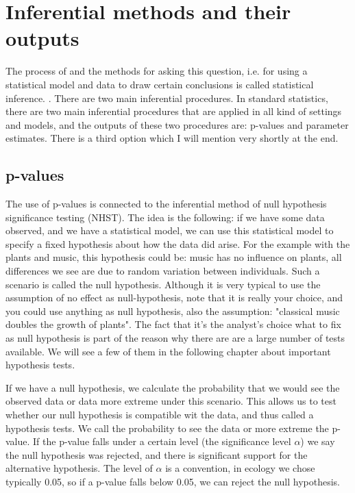 \documentclass[a4paper,twoside]{tufte-book} %
\begin{document}
\section{Inferential methods and their outputs}

The process of and the methods for asking this question, i.e. for using a statistical model and data to draw certain conclusions is called statistical inference. . There are two main inferential procedures. In standard statistics, there are two main inferential procedures that are applied in all kind of settings and models, and the outputs of these two procedures are: p-values and parameter estimates. There is a third option which I will mention very shortly at the end.  

\subsection{p-values}

The use of p-values is connected to the inferential method of null hypothesis significance testing (NHST). The idea is the following: if we have some data observed, and we have a statistical model, we can use this statistical model to specify a fixed hypothesis about how the data did arise. For the example with the plants and music, this hypothesis could be: music has no influence on plants, all differences we see are due to random variation between individuals. Such a scenario is called the null hypothesis.  Although it is very typical to use the assumption of no effect as null-hypothesis, note that it is really your choice, and you could use anything as null hypothesis, also the assumption: "classical music doubles the growth of plants". The fact that it's the analyst's choice what to fix as null hypothesis is part of the reason why there are are a large number of tests available. We will see a few of them in the following chapter about important hypothesis tests.

If we have a null hypothesis, we calculate the probability that we would see the observed data or data more extreme under this scenario. This allows us to test whether our null hypothesis is compatible wit the data, and thus called a hypothesis tests. We call the probability to see the data or more extreme the p-value.  If the p-value falls under a certain level (the significance level $\alpha$) we say the null hypothesis was rejected, and there is significant support for the alternative hypothesis. The level of $\alpha$ is a convention, in ecology we chose typically 0.05, so if a p-value falls below 0.05, we can reject the null hypothesis.  
\end{document}
